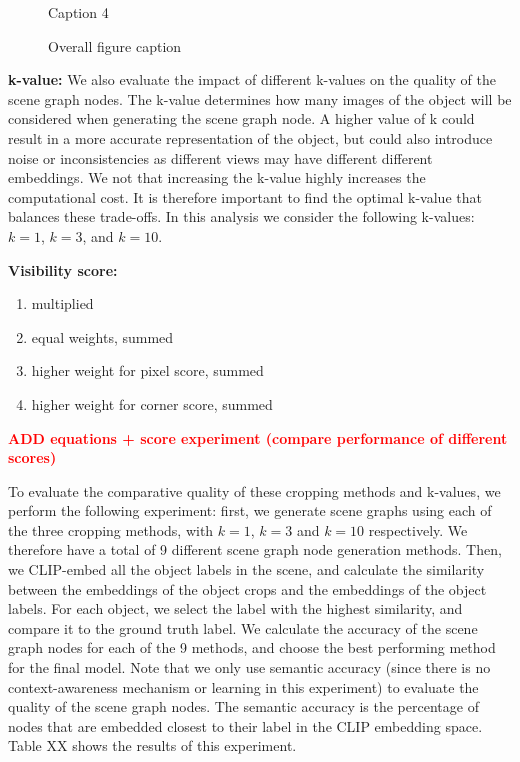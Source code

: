 \begin{figure}[h!]
\begin{minipage}[b]{0.1\textwidth}
        \caption{Caption 4}
    \end{minipage}
    \caption{Overall figure caption}
\end{figure}

\bigskip \noindent
\textbf{k-value:}
We also evaluate the impact of different k-values on the quality of the scene graph nodes. The k-value determines how many images of the object will be considered when generating the scene graph node. A higher value of k could result in a more accurate representation of the object, but could also introduce noise or inconsistencies as different views may have different different embeddings. We not that increasing the k-value highly increases the computational cost. It is therefore important to find the optimal k-value that balances these trade-offs. In this analysis we consider the following k-values: $k=1$, $k=3$, and $k=10$.

\bigskip \noindent
\textbf{Visibility score:}
\begin{enumerate}
    \item multiplied
    \item equal weights, summed
    \item higher weight for pixel score, summed
    \item higher weight for corner score, summed
\end{enumerate}

\textcolor{red}{\textbf{ADD equations + score experiment (compare performance of different scores)}}

To evaluate the comparative quality of these cropping methods and k-values, we perform the following experiment: first, we generate scene graphs using each of the three cropping methods, with $k=1$, $k=3$ and $k=10$ respectively. We therefore have a total of 9 different scene graph node generation methods. Then, we CLIP-embed all the object labels in the scene, and calculate the similarity between the embeddings of the object crops and the embeddings of the object labels. For each object, we select the label with the highest similarity, and compare it to the ground truth label. We calculate the accuracy of the scene graph nodes for each of the 9 methods, and choose the best performing method for the final model.  Note that we only use semantic accuracy (since there is no context-awareness mechanism or learning in this experiment) to evaluate the quality of the scene graph nodes. The semantic accuracy is the percentage of nodes that are embedded closest to their label in the CLIP embedding space. Table XX shows the results of this experiment.

